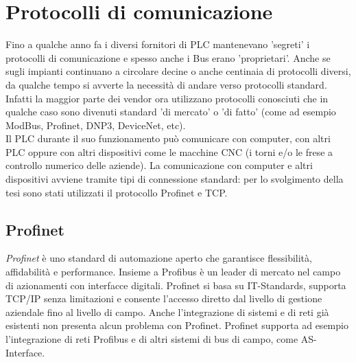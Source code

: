 \documentclass[12pt, a4paper, oneside]{book}
\begin{document}
\chapter{Protocolli di comunicazione}
Fino a qualche anno fa i diversi fornitori di PLC mantenevano 'segreti' i protocolli di comunicazione e spesso anche i Bus erano 'proprietari'. Anche se sugli impianti continuano a circolare decine o anche centinaia di protocolli diversi, da qualche tempo si avverte la necessità di andare verso protocolli standard. Infatti la maggior parte dei vendor ora utilizzano protocolli conosciuti che in qualche caso sono divenuti standard 'di mercato' o 'di fatto' (come ad esempio ModBus, Profinet, DNP3, DeviceNet, etc).
\\Il PLC durante il suo funzionamento può comunicare con computer, con altri PLC oppure con altri dispositivi come le macchine CNC (i torni e/o le frese a controllo numerico delle aziende). La comunicazione con computer e altri dispositivi avviene tramite tipi di connessione standard: per lo svolgimento della tesi sono stati utilizzati il protocollo Profinet e TCP.
\section{Profinet}
\textit{Profinet} \cite{profinet} è uno standard di automazione aperto che garantisce flessibilità, affidabilità
e performance.
Insieme a Profibus è un leader di mercato nel campo di azionamenti con interfacce digitali. Profinet si basa su IT-Standards, supporta TCP/IP senza limitazioni e consente l'accesso diretto dal livello di gestione aziendale fino al livello di campo. Anche l'integrazione di sistemi e di reti già esistenti non presenta alcun problema con Profinet. Profinet supporta ad esempio l'integrazione di reti Profibus e di altri sistemi di bus di campo, come AS-Interface.  
\end{document}
